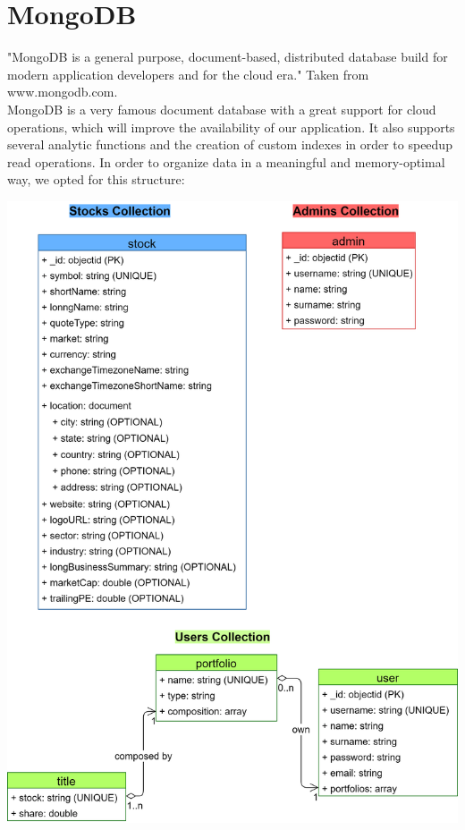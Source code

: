 \section{MongoDB}
"MongoDB is a general purpose, document-based, distributed database build
for modern application developers and for the cloud era." Taken from www.mongodb.com.\\
MongoDB is a very famous document database with a great support for cloud operations, which 
will improve the availability of our application. It also supports several analytic functions
and the creation of custom indexes in order to speedup read operations.
In order to organize data in a meaningful and memory-optimal way, we opted for this structure:

\includegraphics[scale=0.17]{img/mongoDB_schema.png}\\

